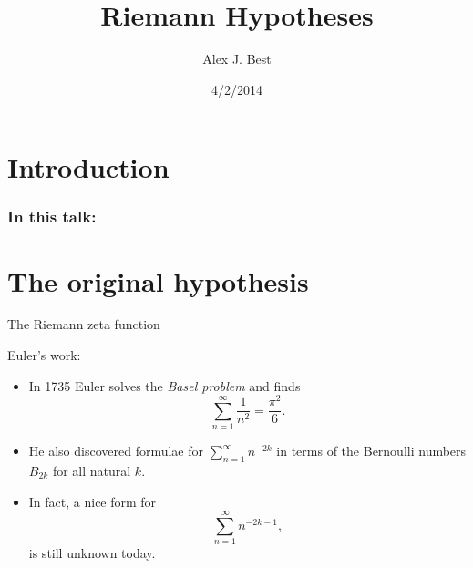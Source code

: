 \documentclass{beamer}
\author{Alex J. Best}
\institute{WMS Talks}
\date{4/2/2014}
\title{Riemann Hypotheses}
\begin{document}
\section{Introduction}

\frame{\titlepage}

\begin{frame}
\frametitle{In this talk:}
\tableofcontents
\end{frame}

\section{The original hypothesis}

\begin{frame}{The Riemann zeta function}
\begin{block}{Euler's work:}
\begin{itemize}
\pause \item In 1735 Euler solves the \emph{Basel problem} and finds
\[\sum_{n=1}^{\infty} \frac{1}{n^2} = \frac{\pi^2}{6}.\]
\pause \item He also discovered formulae for $\sum_{n=1}^{\infty} n^{-2k}$ in terms of the Bernoulli numbers $B_{2k}$ for all natural $k$.
\pause \item In fact, a nice form for \[\sum_{n=1}^{\infty} n^{-2k-1},\] is still unknown today. %
\end{itemize}
\end{block}
\end{frame}
\end{document}
